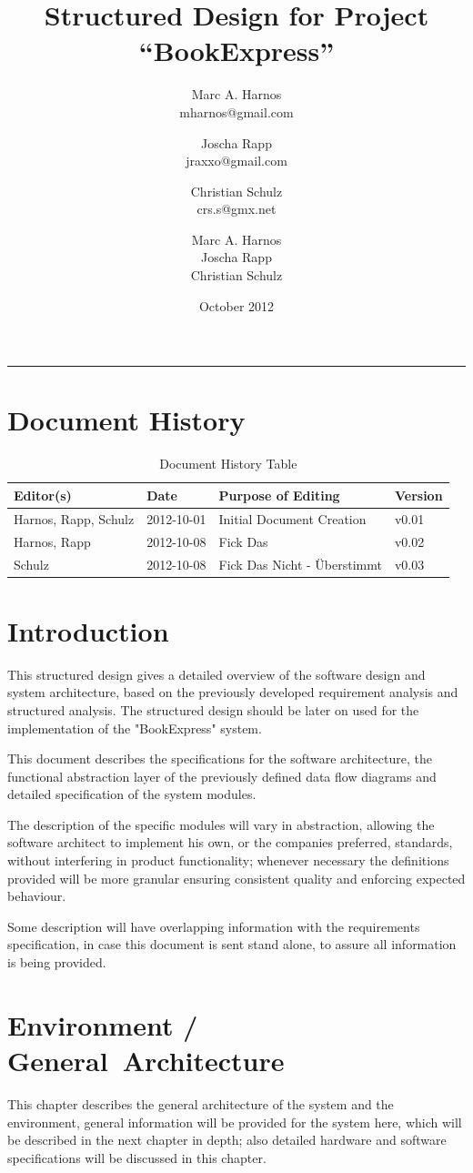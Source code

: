 \documentclass[11pt,a4paper,oneside,svgnames]{report}
\title{Structured Design for Project ``BookExpress''}
\author{Marc A. Harnos\\ {mharnos@gmail.com} \and Joscha Rapp\\ {jraxxo@gmail.com} \and Christian Schulz\\ {crs.s@gmx.net}}
\author{Marc A. Harnos\\ Joscha Rapp\\ Christian Schulz}
\date{October 2012}
\makeatletter
\renewcommand{\maketitle}{\begin{titlepage}%
    \let\footnotesize\small
    \let\footnoterule\relax
    \parindent \z@
    \reset@font
    \null\vfil
    \begin{flushleft}
      \huge \@title
    \end{flushleft}
    \par
    \hrule height 4pt
    \par
    \begin{flushright}
      \LARGE \@author \par
    \end{flushright}
    \vskip 60\p@
    \vfil\null
  \end{titlepage}%
  \setcounter{footnote}{0}%
}
\makeatother
\begin{document}
\maketitle
\tableofcontents

\chapter*{Document History}

\begin{table}[H]
\centering
\begin{tabular}{|l|l|l|l|}
\hline 
Editor(s) & Date & Purpose of Editing & Version \\ 
\hline 
Harnos, Rapp, Schulz & 2012-10-01 & Initial Document Creation & v0.01 \\ 
\hline
Harnos, Rapp & 2012-10-08 & Fick Das & v0.02 \\ 
\hline
Schulz & 2012-10-08 & Fick Das Nicht - Überstimmt & v0.03 \\ 
\hline
\end{tabular} 
\caption{Document History Table}
\label{tab:document-history}
\end{table}


\chapter{Introduction}
This structured design gives a detailed overview of the software design and system architecture, based on the previously developed requirement analysis and structured analysis. The structured design should be later on used for the implementation of the "BookExpress" system.

This document describes the specifications for the software architecture, the functional abstraction layer of the previously defined data flow diagrams and detailed specification of the system modules.

The description of the specific modules will vary in abstraction, allowing the software architect to implement his own, or the companies preferred, standards, without interfering in product functionality; whenever necessary the definitions provided will be more granular ensuring consistent quality and enforcing expected behaviour.

Some description will have overlapping information with the requirements specification, in case this document is sent stand alone, to assure all information is being provided.

\chapter{Environment / General~Architecture}
This chapter describes the general architecture of the system and the environment, general information will be provided for the system here, which will be described in the next chapter in depth; also detailed hardware and software specifications will be discussed in this chapter.
\end{document}

